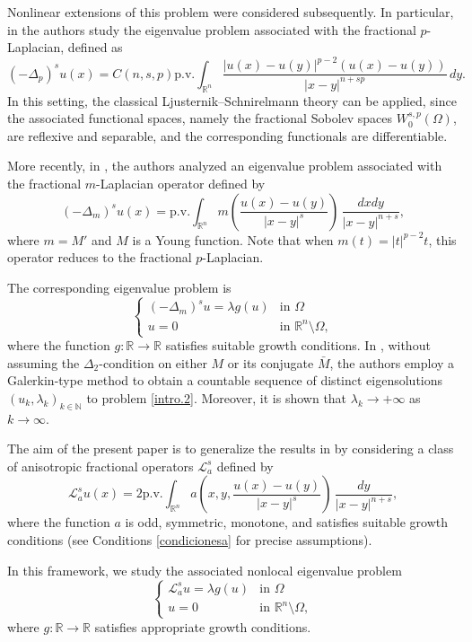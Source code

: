 \documentclass{amsart}
\newcommand{\A}{\mathcal{L}_a^s}
\newcommand{\R}{{\mathbb R}}
\newcommand{\N}{{\mathbb N}}
\theoremstyle{remark}
\theoremstyle{definition}
\numberwithin{equation}{section}
\begin{document}
Nonlinear extensions of this problem were considered subsequently. In particular, in \cite{LindgrenLindqvist2014, FP} the authors study the eigenvalue problem associated with the fractional $p$-Laplacian, defined as
$$
(-\Delta_p)^s u(x) = C(n, s, p)\text{p.v.}\int_{\R^n} \frac{|u(x)-u(y)|^{p-2}(u(x)-u(y))}{|x-y|^{n+sp}}\, dy.
$$
In this setting, the classical Ljusternik--Schnirelmann theory can be applied, since the associated functional spaces, namely the fractional Sobolev spaces $W^{s,p}_0(\Omega)$, are reflexive and separable, and the corresponding functionals are differentiable.

More recently, in \cite{FBSP}, the authors analyzed an eigenvalue problem associated with the fractional $m$-Laplacian operator defined by
$$
(-\Delta_m)^s u(x)=  \text{p.v.}\int_{\R^n} m\left ( \frac{u(x)-u(y)}{|x-y|^s}\right )\,\frac{dxdy}{|x-y|^{n+s}},
$$ 
where $m=M'$ and $M$ is a Young function. Note that when $m(t)=|t|^{p-2}t$, this operator reduces to the fractional $p$-Laplacian.

The corresponding eigenvalue problem is
\begin{equation}\label{intro.2}
\begin{cases}
(-\Delta_m)^s u=\lambda g(u)& \text{in }\Omega\\
u=0 & \text{in }\R^n\setminus \Omega,
\end{cases}
\end{equation}
where the function $g\colon \R\to \R$ satisfies suitable growth conditions. In \cite{FBSP}, without assuming the $\Delta_2$-condition on either $M$ or its conjugate $\bar{M}$, the authors employ a Galerkin-type method to obtain a countable sequence of distinct eigensolutions ${(u_k,\lambda_k)}_{k\in\N}$ to problem \eqref{intro.2}. Moreover, it is shown that $\lambda_k \to +\infty$ as $k\to\infty$.


The aim of the present paper is to generalize the results in \cite{FBSP} by considering a class of anisotropic fractional operators $\A$ defined by
$$
\A u(x)=2\text{p.v.}\int_{\R^n} a\left (x,y,\frac{u(x)-u(y)}{|x-y|^s}\right)\,\frac{dy}{|x-y|^{n+s}},
$$
where the function $a$ is odd, symmetric, monotone, and satisfies suitable growth conditions (see Conditions \ref{condicionesa} for precise assumptions).

In this framework, we study the associated nonlocal eigenvalue problem
\begin{equation}\label{intro.3}
\begin{cases}
\A u=\lambda g(u)& \text{in }\Omega\\
u=0 & \text{in }\R^n\setminus \Omega,
\end{cases}
\end{equation}
where $g\colon \R\to\R$ satisfies appropriate growth conditions.
\end{document}
